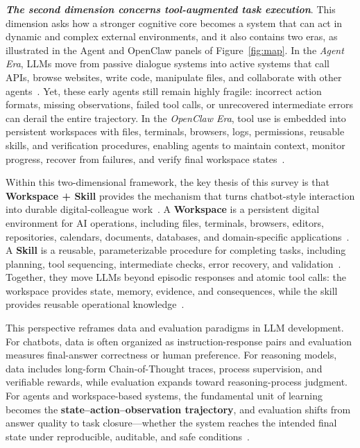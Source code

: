  \textit{\textbf{The second dimension concerns tool-augmented task execution}}. This dimension asks how a stronger cognitive core becomes a system that can act in dynamic and complex external environments, and it also contains two eras, as illustrated in the Agent and OpenClaw panels of Figure~\ref{fig:map}. In the \textit{Agent Era}, LLMs move from passive dialogue systems into active systems that call APIs, browse websites, write code, manipulate files, and collaborate with other agents~\citep{schick2023toolformer,qin2023toolllm,yao2022react,wu2023autogen,hong2023metagpt,xi2023rise,wang2024survey}. Yet, these early agents still remain highly fragile: incorrect action formats, missing observations, failed tool calls, or unrecovered intermediate errors can derail the entire trajectory. In the \textit{OpenClaw Era}, tool use is embedded into persistent workspaces with files, terminals, browsers, logs, permissions, reusable skills, and verification procedures, enabling agents to maintain context, monitor progress, recover from failures, and verify final workspace states~\citep{xu2025toward,guo2024large,lei2025large,sun2025survey,plaat2025agentic}.

Within this two-dimensional framework, the key thesis of this survey is that \textbf{Workspace + Skill} provides the mechanism that turns chatbot-style interaction into durable digital-colleague work~\citep{wang2024openhands,yang2024sweagent,drouin2024workarena}. A \textbf{Workspace} is a persistent digital environment for AI operations, including files, terminals, browsers, editors, repositories, calendars, documents, databases, and domain-specific applications~\citep{xie2024osworld,zhou2023webarena,drouin2024workarena,wang2024openhands}. A \textbf{Skill} is a reusable, parameterizable procedure for completing tasks, including planning, tool sequencing, intermediate checks, error recovery, and validation~\citep{wang2023voyager,shinn2023reflexion,madaan2023selfrefine}. Together, they move LLMs beyond episodic responses and atomic tool calls: the workspace provides state, memory, evidence, and consequences, while the skill provides reusable operational knowledge~\citep{schick2023toolformer,qin2023toolllm,wang2023voyager,wang2024openhands}.

This perspective reframes data and evaluation paradigms in LLM development. For chatbots, data is often organized as instruction-response pairs and evaluation measures final-answer correctness or human preference. For reasoning models, data includes long-form Chain-of-Thought traces, process supervision, and verifiable rewards, while evaluation expands toward reasoning-process judgment. For agents and workspace-based systems, the fundamental unit of learning becomes the \textbf{state--action--observation trajectory}, and evaluation shifts from answer quality to task closure—whether the system reaches the intended final state under reproducible, auditable, and safe conditions~\citep{luo2025large,maestre2024beyond,du2026survey,barua2024exploring,yao2025survey}.

